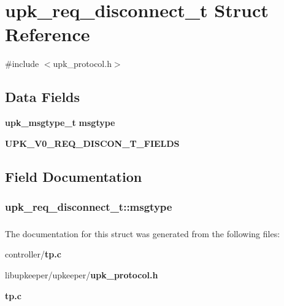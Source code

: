 \section{upk\_\-req\_\-disconnect\_\-t Struct Reference}
\label{structupk__req__disconnect__t}


{\ttfamily \#include $<$upk\_\-protocol.h$>$}

\subsection*{Data Fields}
\begin{DoxyCompactItemize}
\item 
{\bf upk\_\-msgtype\_\-t} {\bf msgtype}
\item 
{\bf UPK\_\-V0\_\-REQ\_\-DISCON\_\-T\_\-FIELDS}
\end{DoxyCompactItemize}


\subsection{Field Documentation}
\subsubsection[{msgtype}]{ {\bf upk\_\-req\_\-disconnect\_\-t::msgtype}}\label{structupk__req__disconnect__t_ae45889969369c519740b278070d29cbb}
\subsubsection[{UPK\_\-V0\_\-REQ\_\-DISCON\_\-T\_\-FIELDS}]{}\label{structupk__req__disconnect__t_a56fedd39c75b4b84c287717fc9955085}


The documentation for this struct was generated from the following files:\begin{DoxyCompactItemize}
\item 
controller/{\bf tp.c}\item 
libupkeeper/upkeeper/{\bf upk\_\-protocol.h}\item 
{\bf tp.c}\end{DoxyCompactItemize}
